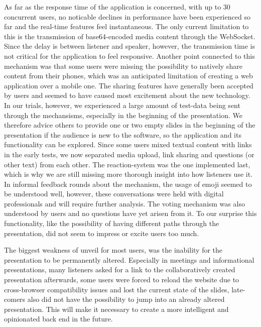 As far as the response time of the application is concerned, with up to 30 concurrent users, no noticable declines in performance have been experienced so far and the real-time features feel instantaneous. The only current limitation to this is the transmission of base64-encoded media content through the WebSocket. Since the delay is between listener and speaker, however, the transmission time is not critical for the application to feel responsive. Another point connected to this mechanism was that some users were missing the possibility to natively share content from their phones, which was an anticipated limitation of creating a web application over a mobile one.
The sharing features have generally been accepted by users and seemed to have caused most excitement about the new technology. In our trials, however, we experienced a large amount of test-data being sent through the mechansisms, especially in the beginning of the presentation. We therefore advice others to provide one or two empty slides in the beginning of the presentation if the audience is new to the software, so the application and its functionality can be explored. Since some users mixed textual content with links in the early tests, we now separated media upload, link sharing and questions (or other text) from each other.
The reaction-system was the one implemented last, which is why we are still missing more thorough insight into how listeners use it. In informal feedback rounds about the mechanism, the usage of emoji seemed to be understood well, however, these conversations were held with digital professionals and will require further analysis.
The voting mechanism was also understood by users and no questions have yet arisen from it. To our surprise this functionality, like the possibility of having different paths through the presentation, did not seem to impress or excite users too much.

The biggest weakness of unveil for most users, was the inability for the presentation to be permanently altered. Especially in meetings and informational presentations, many listeners asked for a link to the collaboratively created presentation afterwards, some users were forced to reload the website due to cross-browser compatibility issues and lost the current state of the slides, late-comers also did not have the possibility to jump into an already altered presentation. This will make it necessary to create a more intelligent and opinionated back end in the future.

